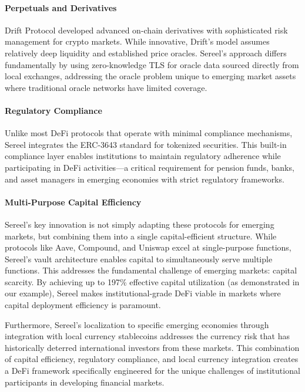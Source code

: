 \documentclass[12pt]{article}
\begin{document}
\paragraph{Perpetuals and Derivatives}
Drift Protocol developed advanced on-chain derivatives with sophisticated risk management for crypto markets. While innovative, Drift's model assumes relatively deep liquidity and established price oracles. Sereel's approach differs fundamentally by using zero-knowledge TLS for oracle data sourced directly from local exchanges, addressing the oracle problem unique to emerging market assets where traditional oracle networks have limited coverage.

\paragraph{Regulatory Compliance}
Unlike most DeFi protocols that operate with minimal compliance mechanisms, Sereel integrates the ERC-3643 standard \citep{erc3643} for tokenized securities. This built-in compliance layer enables institutions to maintain regulatory adherence while participating in DeFi activities—a critical requirement for pension funds, banks, and asset managers in emerging economies with strict regulatory frameworks.

\paragraph{Multi-Purpose Capital Efficiency}
Sereel's key innovation is not simply adapting these protocols for emerging markets, but combining them into a single capital-efficient structure. While protocols like Aave, Compound, and Uniswap excel at single-purpose functions, Sereel's vault architecture enables capital to simultaneously serve multiple functions. This addresses the fundamental challenge of emerging markets: capital scarcity. By achieving up to 197\% effective capital utilization (as demonstrated in our example), Sereel makes institutional-grade DeFi viable in markets where capital deployment efficiency is paramount.

Furthermore, Sereel's localization to specific emerging economies through integration with local currency stablecoins addresses the currency risk that has historically deterred international investors from these markets. This combination of capital efficiency, regulatory compliance, and local currency integration creates a DeFi framework specifically engineered for the unique challenges of institutional participants in developing financial markets.
\end{document}

